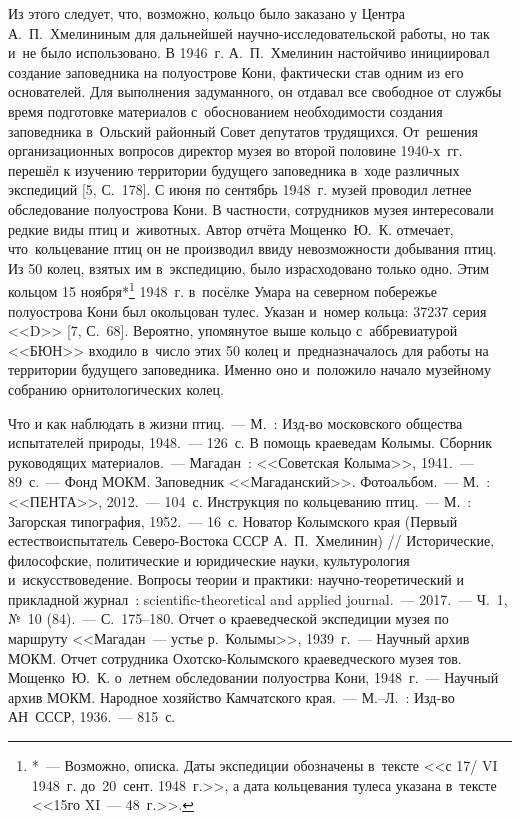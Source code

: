 Из этого следует, что, возможно, кольцо было заказано у Центра А.~П.~Хмелининым для дальнейшей научно-исследовательской работы, но так и~не было использовано. В 1946~г. А.~П.~Хмелинин настойчиво инициировал создание заповедника на полуострове Кони, фактически став одним из его основателей. Для выполнения задуманного, он отдавал все свободное от службы время подготовке материалов с~обоснованием необходимости создания заповедника в~Ольский районный Совет депутатов трудящихся. От~решения организационных вопросов директор музея во второй половине 1940-х~гг. перешёл к изучению территории будущего заповедника в~ходе различных экспедиций [5, С.~178]. С июня по сентябрь 1948~г. музей проводил летнее обследование полуострова Кони. В частности, сотрудников музея интересовали редкие виды птиц и~животных. Автор отчёта Мощенко~Ю.~К. отмечает, что~кольцевание птиц он не производил ввиду невозможности добывания птиц. Из 50 колец, взятых им в~экспедицию, было израсходовано только одно. Этим кольцом 15 ноября*\footnote{*~--- Возможно, описка.  Даты экспедиции обозначены в~тексте <<с 17/ VI 1948~г. до~20~сент. 1948~г.>>, а дата кольцевания тулеса указана в~тексте <<15го XI~--- 48~г.>>.} 1948~г. в~посёлке Умара на северном побережье полуострова Кони был окольцован тулес. Указан и~номер кольца: 37237 серия <<D>> [7, С.~68]. Вероятно, упомянутое выше кольцо с~аббревиатурой <<БЮН>> входило в~число этих 50 колец и~предназначалось для работы на территории будущего заповедника. Именно оно и~положило начало музейному собранию орнитологических колец.

\begin{thebibliography}{99}

\bibitem{} Что и как наблюдать в жизни птиц.~--- М.~: Изд-во московского общества испытателей природы, 1948.~--- 126~с.
\bibitem{}В помощь краеведам Колымы. Сборник руководящих материалов.~--- Магадан~: <<Советская Колыма>>, 1941.~--- 89~с.~--- Фонд МОКМ.
\bibitem{}Заповедник <<Магаданский>>. Фотоальбом.~--- М.~: <<ПЕНТА>>, 2012.~--- 104~с.
\bibitem{}Инструкция по кольцеванию птиц.~--- М.~: Загорская типография, 1952.~--- 16~с.
\bibitem{}Новатор Колымского края (Первый естествоиспытатель Северо-Востока СССР А.~П.~Хмелинин) // Исторические, философские, политические и юридические науки, культурология и~искусствоведение. Вопросы теории и практики: научно-теоретический и прикладной журнал~: scientific-theoretical and applied journal.~--- 2017.~--- Ч.~1, №~10 (84).~--- С.~175--180.
\bibitem{}Отчет о краеведческой экспедиции музея по маршруту <<Магадан~--- устье р.~Колымы>>, 1939~г.~--- Научный архив МОКМ.
\bibitem{}Отчет сотрудника Охотско-Колымского краеведческого музея тов. Мощенко~Ю.~К. о~летнем обследовании полуострва Кони, 1948~г.~--- Научный архив МОКМ.
\bibitem{} Народное хозяйство Камчатского края.~--- М.--Л.~: Изд-во АН~СССР, 1936.~--- 815~с.



\end{thebibliography}
